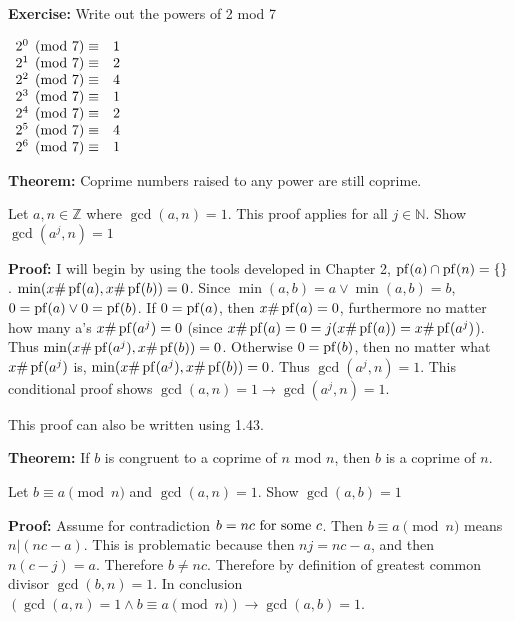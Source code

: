 \item \textbf{Exercise:} Write out the powers of 2 mod 7

\(
\begin{array}[t]{ll}
2^0 \pmod 7 \equiv & 1 \\
2^1 \pmod 7 \equiv & 2 \\
2^2 \pmod 7 \equiv & 4 \\
2^3 \pmod 7 \equiv & 1 \\
2^4 \pmod 7 \equiv & 2 \\
2^5 \pmod 7 \equiv & 4 \\
2^6 \pmod 7 \equiv & 1 \\
\end{array}
\)

\item \textbf{Theorem:} Coprime numbers raised to any power are still coprime.

Let \(a, n \in \mathbb Z\) where \(\gcd(a, n) = 1\). This proof applies for all \(j \in \mathbb N\). Show \(\gcd(a^j, n) = 1\)

\textbf{Proof:} I will begin by using the tools developed in Chapter 2, \(\operatorname{pf}(a) \cap \operatorname{pf}(n)  = \{\}\). \(\min (x \# \operatorname{pf}(a), x \# \operatorname{pf}(b)) = 0\). Since \(\min(a, b) = a \vee \min(a, b) = b\), \(0 = \operatorname{pf}(a) \vee 0 = \operatorname{pf}(b)\). If \(0 = \operatorname{pf}(a)\), then \(x \# \operatorname{pf}(a) = 0\), furthermore no matter how many a's \(x \# \operatorname{pf}(a^j) = 0\) (since \(x \# \operatorname{pf}(a) = 0 = j (x \# \operatorname{pf}(a)) = x \# \operatorname{pf}(a^j)\)). Thus \(\min(x \# \operatorname{pf}(a^j), x \# \operatorname{pf}(b)) = 0\). Otherwise \(0 = \operatorname{pf}(b)\), then no matter what \(x \# \operatorname{pf}(a^j)\) is, \(\min(x \# \operatorname{pf}(a^j), x \# \operatorname{pf}(b)) = 0\). Thus \(\gcd(a^j, n) = 1\). This conditional proof shows \(\gcd(a, n) = 1 \rightarrow \gcd(a^j, n) = 1\). \qedhere

This proof can also be written using 1.43.

\item \textbf{Theorem:} If \(b\) is congruent to a coprime of \(n\) mod \(n\), then \(b\) is a coprime of \(n\).

Let \(b \equiv a \pmod n\) and \(\gcd(a, n) = 1\). Show \(\gcd(a, b) = 1\)

\textbf{Proof:} Assume for contradiction \(b = n c \textrm{\ for some\ } c\). Then \(b \equiv a \pmod n\) means \(n | (nc - a)\). This is problematic because then \(nj = nc - a\), and then \(n(c-j) = a\). Therefore \(b \neq nc\). Therefore by definition of greatest common divisor \(\gcd(b, n) = 1\). In conclusion \((\gcd(a, n) = 1 \wedge b \equiv a \pmod n) \rightarrow \gcd(a, b) = 1\). \qedhere

